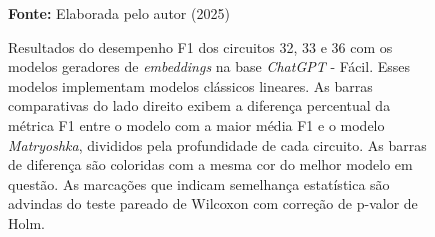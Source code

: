 \begin{figure}
\caption{Resultados do desempenho F1 dos circuitos 32, 33 e 36 com os modelos geradores de \textit{embeddings} na base \textit{ChatGPT} - Fácil. Esses modelos implementam modelos clássicos lineares. As barras comparativas do lado direito exibem a diferença percentual da métrica F1 entre o modelo com a maior média F1 e o modelo \textit{Matryoshka}, divididos pela profundidade de cada circuito. As barras de diferença são coloridas com a mesma cor do melhor modelo em questão. As marcações que indicam semelhança estatística são advindas do teste pareado de Wilcoxon com correção de p-valor de Holm.}
\label{fig:model_transformer:easy:g4}
     \centering
    \centering

      \par\medskip\ABNTEXfontereduzida\selectfont\textbf{Fonte:} Elaborada pelo autor (2025) \par\medskip
\end{figure}